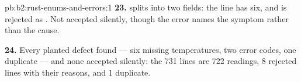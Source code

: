 \begin{solution}{pb:b2:rust-enums-and-errors:1}
\textbf{23.}  splits into two fields: the line has six, and is rejected as . Not
accepted silently, though the error names the symptom rather than the cause.

\textbf{24.} Every planted defect found --- six missing temperatures, two error codes, one duplicate --- and none
accepted silently: the 731 lines are 722 readings, 8 rejected lines with their reasons, and 1 duplicate.
\end{solution}

